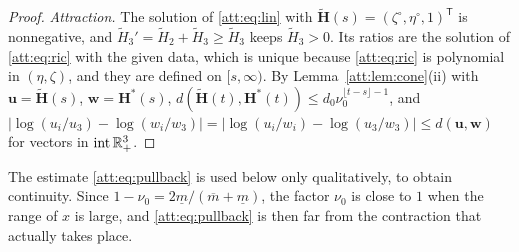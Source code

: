 \begin{proof}
\emph{Attraction.} The solution of \eqref{att:eq:lin} with $\widetilde{\mathbf H}(s)=(\zeta^\circ,\eta^\circ,1)^{\mathsf T}$ is nonnegative, and $\widetilde H_3'=\widetilde H_2+\widetilde H_3\ge\widetilde H_3$ keeps $\widetilde H_3>0$. Its ratios are the solution of \eqref{att:eq:ric} with the given data, which is unique because \eqref{att:eq:ric} is polynomial in $(\eta,\zeta)$, and they are defined on $[s,\infty)$. By Lemma~\ref{att:lem:cone}(ii) with $\mathbf u=\widetilde{\mathbf H}(s)$, $\mathbf w=\mathbf H^\ast(s)$, $d(\widetilde{\mathbf H}(t),\mathbf H^\ast(t))\le d_0\nu_0^{\lfloor t-s\rfloor-1}$, and $|\log(u_i/u_3)-\log(w_i/w_3)|=|\log(u_i/w_i)-\log(u_3/w_3)|\le d(\mathbf u,\mathbf w)$ for vectors in $\operatorname{int}\mathbb R^3_+$.
\end{proof}
The estimate \eqref{att:eq:pullback} is used below only qualitatively, to obtain continuity. Since $1-\nu_0=2\underline m/(\overline m+\underline m)$, the factor $\nu_0$ is close to $1$ when the range of $x$ is large, and \eqref{att:eq:pullback} is then far from the contraction that actually takes place.

